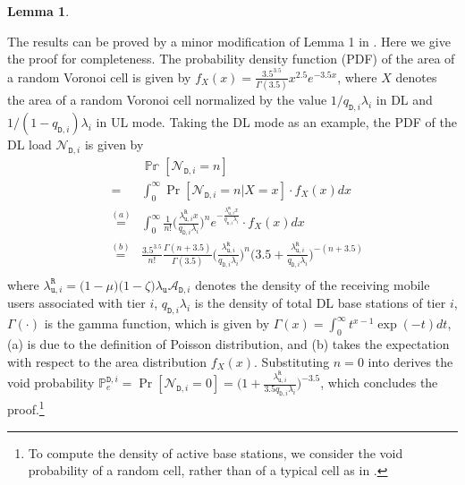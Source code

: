 \documentclass[twocolumn,english]{IEEEtran}
\theoremstyle{plain}
\theoremstyle{definition}
\newtheorem{lemma}{\textbf{Lemma}}
\begin{document}
\begin{lemma}
\begin{IEEEproof}
The results can be proved by a minor modification of Lemma 1 in \cite{DCAB}.
Here we give the proof for completeness. The probability density function
(PDF) of the area of a random Voronoi cell is given by $f_{X}(x)=\frac{3.5^{3.5}}{\Gamma(3.5)}x^{2.5}e^{-3.5x}$,
where $X$ denotes the area of a random Voronoi cell normalized by
the value $1/q_{\mathtt{D},i}\lambda_{i}$ in DL and $1/(1-q_{\mathtt{D},i})\lambda_{i}$
in UL mode. Taking the DL mode as an example, the PDF of the DL load
$\mathcal{N}_{\mathtt{D},i}$\textbf{ }is given by
\begin{eqnarray}
 &  & \mathbb{\Pr}[\mathcal{N}_{\mathtt{D},i}=n]\nonumber \\
 & = & \int_{0}^{\infty}\Pr[\mathcal{N}_{\mathtt{D},i}=n|X=x]\cdot f_{X}(x)dx\nonumber \\
 & \overset{(a)}{=} & \int_{0}^{\infty}\frac{1}{n!}\bigl(\frac{\lambda_{\mathtt{u},i}^{\mathtt{R}}x}{q_{\mathtt{D},i}\lambda_{i}}\bigr)^{n}e^{-\frac{\lambda_{\mathtt{u},i}^{\mathtt{R}}x}{q_{\mathtt{D},i}\lambda_{i}}}\cdot f_{X}(x)dx\nonumber \\
 & \overset{(b)}{=} & \frac{3.5^{3.5}}{n!}\frac{\Gamma\left(n+3.5\right)}{\Gamma\left(3.5\right)}\bigl(\frac{\lambda_{\mathtt{u},i}^{\mathtt{R}}}{q_{\mathtt{D},i}\lambda_{i}}\bigr)^{n}\bigl(3.5+\frac{\lambda_{\mathtt{u},i}^{\mathtt{R}}}{q_{\mathtt{D},i}\lambda_{i}}\bigr)^{-\left(n+3.5\right)}\nonumber \\
\label{eq:Load exact}
\end{eqnarray}
where $\lambda_{\mathtt{u},i}^{\mathtt{R}}=\bigl(1-\mu\bigr)\bigl(1-\zeta\bigr)\lambda_{\mathtt{u}}\mathcal{A}_{\mathtt{D},i}$
denotes the density of the receiving mobile users associated with
tier $i$, $q_{\mathtt{D},i}\lambda_{i}$ is the density of total
DL base stations of tier $i$, $\Gamma(\cdot)$ is the gamma function,
which is given by $\Gamma\left(x\right)=\int_{0}^{\infty}t^{x-1}\exp\left(-t\right)dt$,
(a) is due to the definition of Poisson distribution, and (b) takes
the expectation with respect to the area distribution $f_{X}(x)$.
Substituting $n=0$ into  derives the void
probability $\mathbb{P}_{e}^{\mathtt{D},i}=\Pr[\mathcal{N}_{\mathtt{D},i}=0]=\bigl(1+\frac{\lambda_{\mathtt{u},i}^{\mathtt{R}}}{3.5q_{\mathtt{D},i}\lambda_{i}}\bigr)^{-3.5}$,
which concludes the proof.\footnote{To compute the density of active base stations, we consider the void
probability of a random cell, rather than of a typical cell as in
\cite{OIHN}. }
\end{IEEEproof}
\end{lemma}
\end{document}
